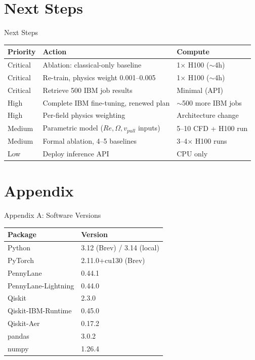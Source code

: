 \documentclass[aspectratio=169]{beamer}
\begin{document}
\section{Next Steps}

\begin{frame}{Next Steps}
\begin{table}
\centering
\small
\begin{tabular}{lll}
\toprule
Priority & Action & Compute \\
\midrule
Critical & Ablation: classical-only baseline & 1$\times$ H100 ($\sim$4h) \\
Critical & Re-train, physics weight 0.001--0.005 & 1$\times$ H100 ($\sim$4h) \\
Critical & Retrieve 500 IBM job results & Minimal (API) \\
High & Complete IBM fine-tuning, renewed plan & $\sim$500 more IBM jobs \\
High & Per-field physics weighting & Architecture change \\
Medium & Parametric model ($Re, \Omega, v_{pull}$ inputs) & 5--10 CFD + H100 run \\
Medium & Formal ablation, 4--5 baselines & 3--4$\times$ H100 runs \\
Low & Deploy inference API & CPU only \\
\bottomrule
\end{tabular}
\end{table}
\end{frame}

\section{Appendix}

\begin{frame}{Appendix A: Software Versions}
\begin{table}
\centering
\begin{tabular}{ll}
\toprule
Package & Version \\
\midrule
Python & 3.12 (Brev) / 3.14 (local) \\
PyTorch & 2.11.0+cu130 (Brev) \\
PennyLane & 0.44.1 \\
PennyLane-Lightning & 0.44.0 \\
Qiskit & 2.3.0 \\
Qiskit-IBM-Runtime & 0.45.0 \\
Qiskit-Aer & 0.17.2 \\
pandas & 3.0.2 \\
numpy & 1.26.4 \\
\bottomrule
\end{tabular}
\end{table}
\end{frame}
\end{document}
